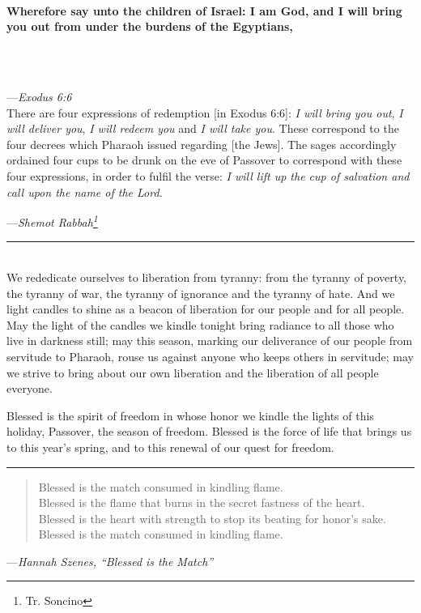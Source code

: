 \documentclass[a4paper,12pt,openany]{memoir}
\newcommand{\HgSource}[1]{\hfill{\small---\itshape{#1}}}
\newcommand{\HgHL}[1]{{\Large\textbf{#1}\par\noindent\\[-.5em]}}
\newcommand{\HgFill}{\vfill \hrule \vfill}
\newenvironment{HgEnglish}{\strut\\\noindent}{\vspace{1em}}
\newcommand{\JSrc}{\textsuperscript{\upshape{[J]}}}
\newcommand{\SSrc}{\textsuperscript{\upshape{[S]}}}
\begin{document}
\begin{HgEnglish}
  \HgHL{
  Wherefore say unto the children of Israel: I am God, and I will bring you out
  from under the burdens of the Egyptians,}\\[-3em]

  \HgSource{Exodus 6:6 \JSrc}\\

  \noindent There are four expressions of redemption [in Exodus 6:6]: {\itshape
  I will bring you out}, {\itshape I will deliver you}, {\itshape I will redeem
  you} and {\itshape I will take you}. These correspond to the four decrees
  which Pharaoh issued regarding [the Jews]. The sages accordingly ordained four
  cups to be drunk on the eve of Passover to correspond with these four
  expressions, in order to fulfil the verse: {\itshape I will lift up the cup of
  salvation and call upon the name of the Lord.}

  \HgSource{Shemot Rabbah\footnote{Tr. Soncino}}
\end{HgEnglish}

\HgFill

\begin{HgEnglish}
  We rededicate ourselves to liberation from tyranny: from the tyranny of
  poverty, the tyranny of war, the tyranny of ignorance and the tyranny of hate.
  And we light candles to shine as a beacon of liberation for our people and for
  all people. May the light of the candles we kindle tonight bring radiance to
  all those who live in darkness still; may this season, marking our deliverance
  of our people from servitude to Pharaoh, rouse us against anyone who keeps
  others in servitude; may we strive to bring about our own liberation and the
  liberation of all people everyone.

  Blessed is the spirit of freedom in whose honor we kindle the lights of this
  holiday, Passover, the season of freedom. Blessed is the force of life that
  brings us to this year’s spring, and to this renewal of our quest for freedom.
  \SSrc
\end{HgEnglish}

\HgFill

\begin{verse}
  Blessed is the match consumed in kindling flame. \\
  Blessed is the flame that burns in the secret fastness of the heart. \\
  Blessed is the heart with strength to stop its beating for honor's sake. \\
  Blessed is the match consumed in kindling flame.
\end{verse}
\HgSource{Hannah Szenes, ``Blessed is the Match''}
\end{document}
